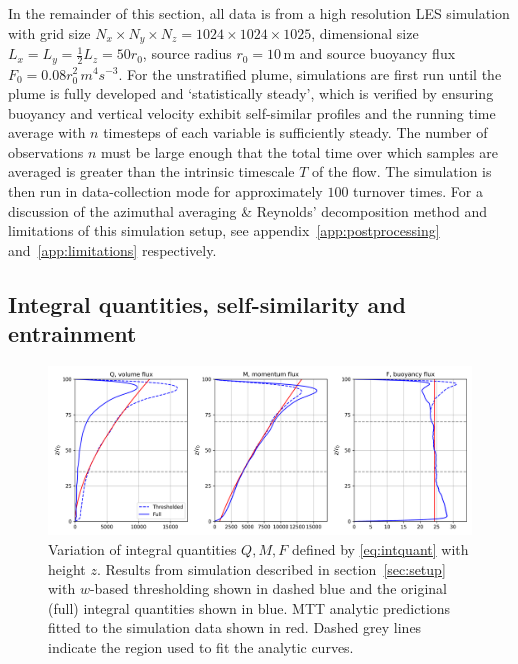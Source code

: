 \documentclass[a4paper]{article}
\begin{document}
In the remainder of this section, all data is from a high resolution LES simulation with grid size $N_x
\times N_y \times N_z = 1024 \times 1024 \times 1025$, dimensional size $L_x = L_y = \frac{1}{2}L_z = 50r_0$,
source radius $r_0 = 10 \,\mathrm{m}$ and source buoyancy flux $F_0 = 0.08r_0^2 \,m^4 s^{-3}$. For the
unstratified plume, simulations are first run until the plume is fully developed and `statistically steady',
which is verified by ensuring buoyancy and vertical velocity exhibit self-similar profiles and the running
time average with $n$ timesteps of each variable is sufficiently steady. The number of observations $n$ must be
large enough that the total time over which samples are averaged is greater than the intrinsic timescale $T$
of the flow. The simulation is then run in data-collection mode for approximately $100$ turnover times. For a
discussion of the azimuthal averaging \& Reynolds' decomposition method and limitations of this simulation
setup, see appendix~\ref{app:postprocessing} and~\ref{app:limitations} respectively.

\subsection{Integral quantities, self-similarity and entrainment}

\begin{figure}
	\centering
	\includegraphics[width=.8\textwidth]{mvr/fig0.png}
	\caption{Variation of integral quantities $Q, M, F$ defined by \eqref{eq:intquant} with height $z$.
	Results from simulation described in section~\ref{sec:setup} with
	$w$-based thresholding shown in dashed blue and the original (full) integral quantities shown in blue.
	MTT analytic predictions fitted to the simulation data shown in red. Dashed grey lines indicate the
	region used to fit the analytic curves.}
	\label{fig:QMF}
\end{figure}
\end{document}
